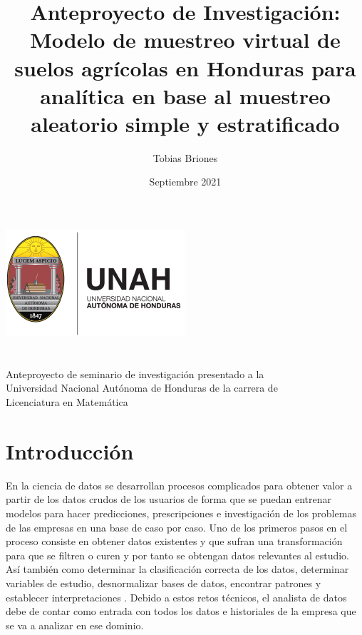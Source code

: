 \documentclass{report}
\title{Anteproyecto de Investigación: Modelo de muestreo virtual de suelos agrícolas en Honduras para analítica en base al muestreo aleatorio simple y estratificado}
\author{Tobias Briones}
\date{Septiembre 2021}
\begin{document}
\makeatletter
    \begin{titlepage}
        \begin{center}
            \includegraphics[width=0.3\linewidth]{ref/logo-unah.png}\\[4ex]
            {\huge \bfseries \@title 
            \vspace{1cm}}\\[2ex]
            {\LARGE \@author}\\[50ex] 
            
            {\large
            Anteproyecto de seminario de investigación presentado a la\\
            Universidad Nacional Autónoma de Honduras de la carrera de\\
            Licenciatura en Matemática
            }\\[2ex]
            
            {\large \@date}
        \end{center}
    \end{titlepage}
\makeatother
\thispagestyle{empty}
\newpage

\thispagestyle{empty}
\tableofcontents
\listoffigures
\newpage

\chapter{Introducción}

En la ciencia de datos se desarrollan procesos complicados para obtener valor a partir de los datos crudos de los usuarios de forma que se puedan entrenar modelos para hacer predicciones, prescripciones e investigación de los problemas de las empresas en una base de caso por caso. Uno de los primeros pasos en el proceso consiste en obtener datos existentes y que sufran una transformación para que se filtren o curen y por tanto se obtengan datos relevantes al estudio. Así también como determinar la clasificación correcta de los datos, determinar variables de estudio, desnormalizar bases de datos, encontrar patrones y establecer  interpretaciones \cite{university-of-wisconsin-data-science-2021}. Debido a estos retos técnicos, el analista de datos debe de contar como entrada con todos los datos e historiales de la empresa que se va a analizar en ese dominio.
\end{document}
